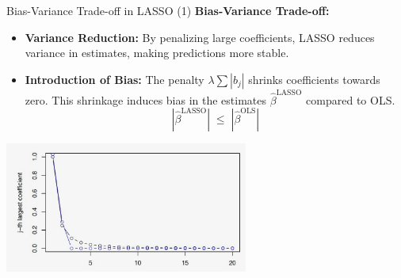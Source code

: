 \documentclass[xcolor=svgnames,t]{beamer}
\begin{document}
\begin{frame}{Bias-Variance Trade-off in LASSO (1)}
    \textbf{Bias-Variance Trade-off:} 
    \begin{itemize}
        \item \textbf{Variance Reduction:} By penalizing large coefficients, LASSO reduces variance in estimates, making predictions more stable.
        \pause
        \item \textbf{Introduction of Bias:} The penalty \(\lambda \sum |b_j|\) shrinks coefficients towards zero. This shrinkage induces bias in the estimates \(\widehat{\beta}^{\text{LASSO}}\) compared to OLS.\\[5pt]
        \[
        |\widehat{\beta}^{\text{LASSO}}| \;\leq\; |\widehat{\beta}^{\text{OLS}}|
        \]
    \end{itemize}
    
    \pause
    
    \begin{center}
    \includegraphics[width=0.6\textwidth]{Figures/bias.jpeg}
    \end{center}
    \end{frame}
    
\end{document}

